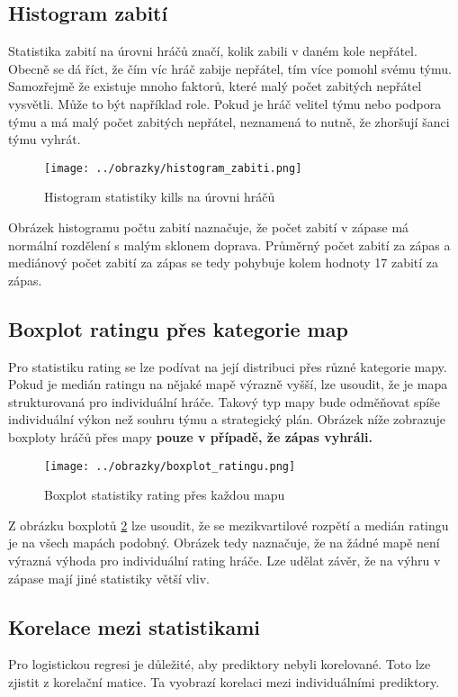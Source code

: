 \subsection{Histogram zabití}
Statistika zabití na úrovni hráčů značí, kolik zabili v daném kole nepřátel. Obecně se dá říct, že čím víc hráč zabije nepřátel, tím více pomohl svému týmu.
Samozřejmě že existuje mnoho faktorů, které malý počet zabitých nepřátel vysvětli. Může to být například role. Pokud je hráč velitel týmu nebo podpora týmu a má malý
počet zabitých nepřátel, neznamená to nutně, že zhoršují šanci týmu vyhrát.

\begin{figure}[H]
    \centering
    \texttt{[image: ../obrazky/histogram\_zabiti.png]}
    \caption{Histogram statistiky kills na úrovni hráčů} 
    \label{fig:histogram_zabiti}
\end{figure}

Obrázek histogramu počtu zabití naznačuje, že počet zabití v zápase má normální rozdělení s malým sklonem doprava. Průměrný počet zabití za zápas a mediánový
počet zabití za zápas se tedy pohybuje kolem hodnoty 17 zabití za zápas.

\subsection{Boxplot ratingu přes kategorie map}
Pro statistiku rating se lze podívat na její distribuci přes různé kategorie mapy. Pokud je medián ratingu na nějaké mapě výrazně vyšší, lze usoudit,
že je mapa strukturovaná pro individuální hráče. Takový typ mapy bude odměňovat spíše individuální výkon než souhru týmu a strategický plán. Obrázek níže
zobrazuje boxploty hráčů přes mapy \textbf{pouze v případě, že zápas vyhráli.}

\begin{figure}[H]
    \centering
    \texttt{[image: ../obrazky/boxplot\_ratingu.png]}
    \caption{Boxplot statistiky rating přes každou mapu} 
    \label{fig:boxplot_ratingu_pres_mapu}
\end{figure}

Z obrázku boxplotů \ref{fig:boxplot_ratingu_pres_mapu} lze usoudit, že se mezikvartilové rozpětí a medián ratingu je na všech mapách podobný. Obrázek tedy naznačuje,
že na žádné mapě není výrazná výhoda pro individuální rating hráče. Lze udělat závěr, že na výhru v zápase mají jiné statistiky větší vliv.

\subsection{Korelace mezi statistikami}
Pro logistickou regresi je důležité, aby prediktory nebyli korelované. Toto lze zjistit z korelační matice. Ta vyobrazí korelaci mezi individuálními prediktory.

